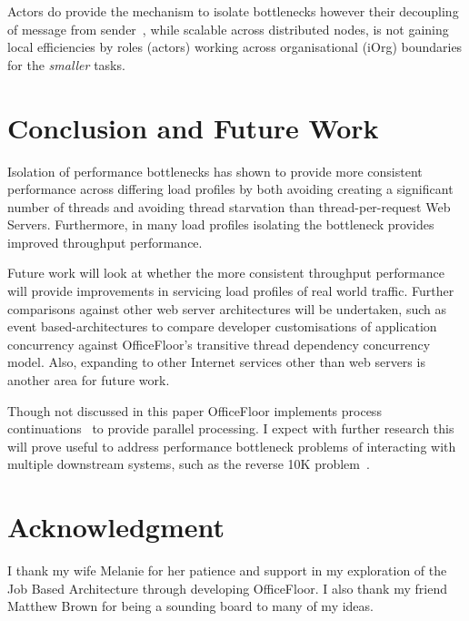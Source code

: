 \documentclass[conference]{ieee/IEEEtran}
\begin{document}
Actors do provide the mechanism to isolate bottlenecks however their decoupling
of message from sender~\cite{actors}, while scalable across distributed nodes,
is not gaining local efficiencies by roles (actors) working across
organisational (iOrg) boundaries for the \textit{smaller} tasks.


\section{Conclusion and Future Work}
Isolation of performance bottlenecks has shown to provide more consistent
performance across differing load profiles by both avoiding creating a
significant number of threads and avoiding thread starvation than
thread-per-request Web Servers.  Furthermore, in many load profiles isolating
the bottleneck provides improved throughput performance.

Future work will look at whether the more consistent throughput performance will
provide improvements in servicing load profiles of real world traffic.
Further comparisons against other web server architectures will be undertaken,
such as event based-architectures to compare developer customisations of
application concurrency against OfficeFloor's transitive thread dependency
concurrency model.  Also, expanding to other Internet services other than web
servers is another area for future work.

Though not discussed in this paper OfficeFloor implements process
continuations~\cite{process-continuation} to provide parallel processing.  I
expect with further research this will prove useful to address performance
bottleneck problems of interacting with multiple downstream systems, such as the
reverse 10K problem~\cite{reverse-ten-k-problem}.









\section*{Acknowledgment} I thank my wife Melanie for her patience and support
in my exploration of the Job Based Architecture through developing OfficeFloor. 
I also thank my friend Matthew Brown for being a sounding board to many of my
ideas.
\end{document}
